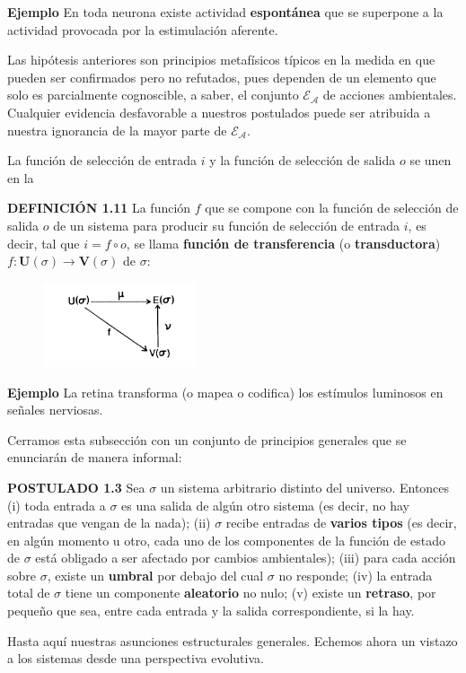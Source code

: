 {\fontsize{13}{15}\selectfont
\textbf{Ejemplo} En toda neurona existe actividad \textbf{espontánea} que se superpone a la actividad provocada por la estimulación aferente.

Las hipótesis anteriores son principios metafísicos típicos en la medida en que pueden ser confirmados pero no refutados, pues dependen de un elemento que solo es parcialmente cognoscible, a saber, el conjunto $\mathcal{E}_{\mathcal{A}}$ de acciones ambientales. Cualquier evidencia desfavorable a nuestros postulados puede ser atribuida a nuestra ignorancia de la mayor parte de $\mathcal{E}_{\mathcal{A}}$.

La función de selección de entrada $i$ y la función de selección de salida $o$ se unen en la

\textbf{DEFINICIÓN 1.11} La función $f$ que se compone con la función de selección de salida $o$ de un sistema para producir su función de selección de entrada $i$, es decir, tal que $i = f \circ o$, se llama \textbf{función de transferencia} (o \textbf{transductora}) $f: \mathbf{U}(\sigma) \longrightarrow \mathbf{V}(\sigma)$ de $\sigma$:
\begin{figure}[h!]
    \centering
    \includegraphics[width=0.4\textwidth]{imagenes/definition1.11.png}
\end{figure}

\textbf{Ejemplo} La retina transforma (o mapea o codifica) los estímulos luminosos en señales nerviosas.

Cerramos esta subsección con un conjunto de principios generales que se enunciarán de manera informal:

\textbf{POSTULADO 1.3} Sea $\sigma$ un sistema arbitrario distinto del universo. Entonces
(i) toda entrada a $\sigma$ es una salida de algún otro sistema (es decir, no hay entradas que vengan de la nada);
(ii) $\sigma$ recibe entradas de \textbf{varios tipos} (es decir, en algún momento u otro, cada uno de los componentes de la función de estado de $\sigma$ está obligado a ser afectado por cambios ambientales);
(iii) para cada acción sobre $\sigma$, existe un \textbf{umbral} por debajo del cual $\sigma$ no responde;
(iv) la entrada total de $\sigma$ tiene un componente \textbf{aleatorio} no nulo;
(v) existe un \textbf{retraso}, por pequeño que sea, entre cada entrada y la salida correspondiente, si la hay.

Hasta aquí nuestras asunciones estructurales generales. Echemos ahora un vistazo a los sistemas desde una perspectiva evolutiva.
}

